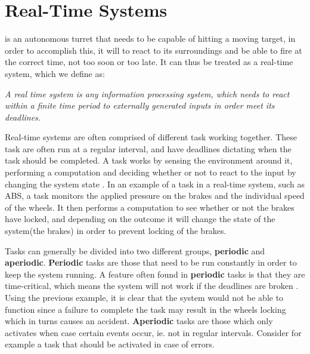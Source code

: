 \section{Real-Time Systems}

\name is an autonomous turret that needs to be capable of hitting a moving
target, in order to accomplish this, it will to react to its surroundings and
be able to fire at the correct time, not too soon or too late. It can thus be
treated as a real-time system, which we define as:


\begin{center}
\begin{minipage}{0.8\linewidth}
\textit{A real time system is any information processing system, which needs to
react within a finite time period to externally generated inputs in order meet
its deadlines.}
\end{minipage}
\end{center} 

Real-time systems are often comprised of different task working together. These
task are often run at a regular interval, and have deadlines dictating when the
task should be completed. A task works by sensing the environment around it,
performing a computation and deciding whether or not to react to the input by
changing the system state \citep[Chap 1]{Realtime}. In an example of a task in a
real-time system, such as ABS, a task monitors the applied pressure on the brakes and the individual
speed of the wheels. It then performs a computation to see whether or not the
brakes have locked, and depending on the outcome it will change the state of the
system(the brakes) in order to prevent locking of the brakes.\nl

Tasks can generally be divided into two different groups, \textbf{periodic} and
\textbf{aperiodic}. \textbf{Periodic} tasks are those that need to be run
constantly in order to keep the system running. A feature often found in
\textbf{periodic} tasks is that they are time-critical, which means the system
will not work if the deadlines are broken \citep[Chap 1]{Realtime}. Using the
previous example, it is clear that the system would not be able to function since a failure to complete
the task may result in the wheels locking which in turns causes an accident.
\textbf{Aperiodic} tasks are those which only activates when case certain events
occur, ie. not in regular intervals. Consider for example a task that should
be activated in case of errors.\nl

